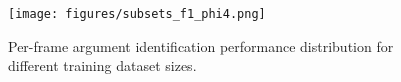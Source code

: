 \begin{figure}
  \centering
  \texttt{[image: figures/subsets\_f1\_phi4.png]}
  
  \caption{\label{fig:subsets-f1} Per-frame argument identification performance distribution for different training dataset sizes.}
\end{figure}